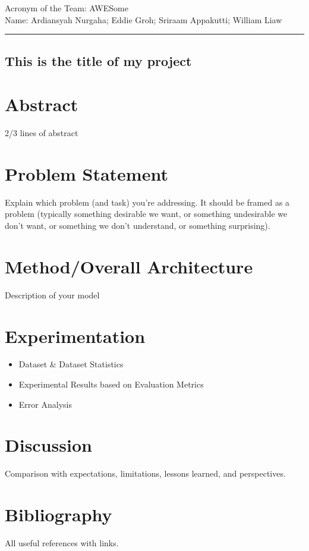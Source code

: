 \documentclass[12pt,a4paper]{article}
\begin{document}
\noindent Acronym of the Team: AWESome\\
Name: Ardiansyah Nurgaha; Eddie Groh; Sriraam Appakutti; William Liaw

    {\centering\rule{\linewidth}{.5pt}}


\begin{center}
    \section*{This is the title of my project}
\end{center}
\section*{Abstract}

2/3 lines of abstract

\section*{Problem Statement}

Explain which problem (and task) you're addressing.
It should be framed as a problem (typically something desirable we want, or something undesirable we don't want, or something we don't understand, or something surprising).

\section*{Method/Overall Architecture}

Description of your model

\section*{Experimentation}

\begin{itemize}
    \item Dataset \& Dataset Statistics
    \item Experimental Results based on Evaluation Metrics
    \item Error Analysis
\end{itemize}

\section*{Discussion}

Comparison with expectations, limitations, lessons learned, and perspectives.

\section*{Bibliography}

All useful references with links.
\end{document}

